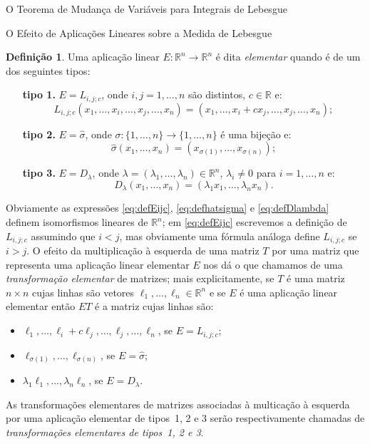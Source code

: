 \documentclass[oneside,final,11pt]{amsbook}
\newcommand{\R}{\mathds R}
\theoremstyle{remark}\newtheorem{exercise}{Exercício}[chapter]
\theoremstyle{remark}\newtheorem{*exercise}[exercise]{\hbox to 0pt{\hskip 0pt minus 1fil*}Exercício}
\theoremstyle{definition}\newtheorem{exdefin}{Definição}[chapter]
\theoremstyle{plain}\newtheorem{teo}{Teorema}[section]
\theoremstyle{plain}\newtheorem{lem}[teo]{Lema}
\theoremstyle{plain}\newtheorem{prop}[teo]{Proposição}
\theoremstyle{plain}\newtheorem{cor}[teo]{Corolário}
\theoremstyle{definition}\newtheorem{defin}[teo]{Definição}
\theoremstyle{remark}\newtheorem{rem}[teo]{Observação}
\theoremstyle{definition}\newtheorem{notation}[teo]{Notação}
\theoremstyle{definition}\newtheorem{convention}[teo]{Convenção}
\theoremstyle{definition}\newtheorem{example}[teo]{Exemplo}
\numberwithin{section}{chapter}
\numberwithin{equation}{section}
\begin{document}
\begin{chapter}{O Teorema de Mudança de Variáveis para Integrais de Lebesgue}
\begin{section}{O Efeito de Aplicações Lineares sobre a Medida de Lebesgue}
\begin{defin}
Uma aplicação linear $E:\R^n\to\R^n$ é dita {\em elementar\/}
quando é de um dos seguintes tipos:
\begin{itemize}
\item[\textbf{tipo 1.}] $E=L_{i,j;c}$, onde $i,j=1,\ldots,n$ são distintos, $c\in\R$ e:
\begin{equation}\label{eq:defEijc}
L_{i,j;c}(x_1,\ldots,x_i,\ldots,x_j,\ldots,x_n)=(x_1,\ldots,x_i+cx_j,\ldots,x_j,\ldots,x_n);
\end{equation}
\item[\textbf{tipo 2.}] $E=\widehat\sigma$\index[simbolos]{$\widehat\sigma$},
onde $\sigma:\{1,\ldots,n\}\to\{1,\ldots,n\}$ é uma bijeção e:
\begin{equation}\label{eq:defhatsigma}
\widehat\sigma(x_1,\ldots,x_n)=(x_{\sigma(1)},\ldots,x_{\sigma(n)});
\end{equation}
\item[\textbf{tipo 3.}] $E=D_\lambda$,
onde $\lambda=(\lambda_1,\ldots,\lambda_n)\in\R^n$, $\lambda_i\ne0$ para $i=1,\ldots,n$ e:
\begin{equation}\label{eq:defDlambda}
D_\lambda(x_1,\ldots,x_n)=(\lambda_1x_1,\ldots,\lambda_nx_n).
\end{equation}
\end{itemize}
\end{defin}
Obviamente as expressões \eqref{eq:defEijc}, \eqref{eq:defhatsigma} e \eqref{eq:defDlambda} definem isomorfismos lineares
de $\R^n$; em \eqref{eq:defEijc} escrevemos a definição de $L_{i,j;c}$ assumindo que $i<j$, mas obviamente uma fórmula
análoga define $L_{i,j;c}$ se $i>j$. O efeito da multiplicação à esquerda de uma matriz $T$ por uma matriz que representa
uma aplicação linear elementar $E$ nos dá o que chamamos de uma
{\em transformação elementar\/}
de matrizes; mais explicitamente, se $T$ é uma matriz $n\times n$ cujas linhas são vetores $\ell_1,\ldots,\ell_n\in\R^n$
e se $E$ é uma aplicação linear elementar então $ET$ é a matriz cujas linhas são:
\begin{itemize}
\item $\ell_1,\ldots,\ell_i+c\ell_j,\ldots,\ell_j,\ldots,\ell_n$, se $E=L_{i,j;c}$;
\item $\ell_{\sigma(1)},\ldots,\ell_{\sigma(n)}$, se $E=\widehat\sigma$;
\item $\lambda_1\ell_1,\ldots,\lambda_n\ell_n$, se $E=D_\lambda$.
\end{itemize}
As transformações elementares de matrizes associadas à multicação à esquerda por uma aplicação elementar de tipos~1, 2 e 3
serão respectivamente chamadas de {\em transformações elementares de tipos~1, 2 e 3}.


\end{section}
\end{chapter}
\end{document}
